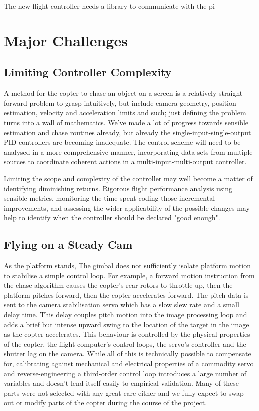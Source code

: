 \documentclass[11pt]{article}
\begin{document}
      The new flight controller needs a library to communicate with the pi


  \section{Major Challenges}
    \subsection{Limiting Controller Complexity}
      A method for the copter to chase an object on a screen is a relatively straight-forward problem to grasp intuitively, but include camera geometry, position estimation, velocity and acceleration limits and such; just defining the problem turns into a wall of mathematics.  We've made a lot of progress towards sensible estimation and chase routines already, but already the single-input-single-output PID controllers are becoming inadequate. The control scheme will need to be analysed in a more comprehensive manner, incorporating data sets from multiple sources to coordinate coherent actions in a multi-input-multi-output controller.

      Limiting the scope and complexity of the controller may well become a matter of identifying diminishing returns.  Rigorous flight performance analysis using sensible metrics, monitoring the time spent coding those incremental improvements, and assessing the wider applicability of the possible changes may help to identify when the controller should be declared "good enough".


    \subsection{Flying on a Steady Cam}
    \label{sec:Camera Stability}
      As the platform stands, The gimbal does not sufficiently isolate platform motion to stabilise a simple control loop.
      For example, a forward motion instruction from the chase algorithm causes the copter's rear rotors to throttle up, then the platform pitches forward, then the copter accelerates forward.  The pitch data is sent to the camera stabilisation servo which has a slow slew rate and a small delay time.  This delay couples pitch motion into the image processing loop and adds a brief but intense upward swing to the location of the target in the image as the copter accelerates.
      This behaviour is controlled by the physical properties of the copter, the flight-computer's control loops, the servo's controller and the shutter lag on the camera. While all of this is technically possible to compensate for, calibrating against mechanical and electrical properties of a commodity servo and reverse-engineering a third-order control loop introduces a large number of variables and doesn't lend itself easily to empirical validation.  Many of these parts were not selected with any great care either and we fully expect to swap out or modify parts of the copter during the course of the project.
\end{document}
